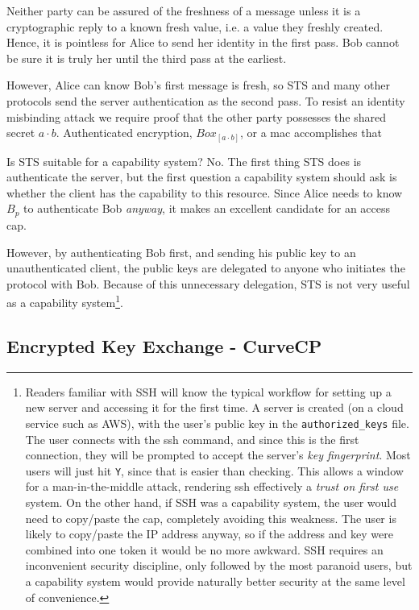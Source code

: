 \documentclass[12pt]{article}
\begin{document}
Neither party can be assured of the freshness of a message
unless it is a cryptographic reply to a known fresh value,
i.e. a value they freshly created. Hence, it is pointless for Alice
to send her identity in the first pass. Bob cannot be sure it is truly her
until the third pass at the earliest.

However, Alice can know Bob's first message is fresh, so STS and many
other protocols send the server authentication as the second pass.
To resist an identity misbinding attack we require proof that the
other party possesses the shared secret $a\cdot b$. Authenticated encryption,
$Box_{[a\cdot b]}$, or a mac accomplishes that \cite[section 3.1]{sigma}


Is STS suitable for a capability system? No. The first thing STS
does is authenticate the server, but the first question a capability
system should ask is whether the client has the capability to
this resource. Since Alice needs to know $B_p$ to authenticate
Bob \emph{anyway}, it makes an excellent candidate for an access cap.

However, by authenticating Bob first, and sending his public key to
an unauthenticated client, the public keys are delegated to anyone
who initiates the protocol with Bob. Because of this unnecessary
delegation, STS is not very useful as a capability system\footnote{
  Readers familiar with SSH will know the typical workflow for setting
  up a new server and accessing it for the first time. A server is
  created (on a cloud service such as AWS), with the user's public
  key in the \texttt{authorized\_keys} file. The user connects with the
  ssh command, and since this is the first connection, they will be
  prompted to accept the server's \emph{key fingerprint}.
  Most users will just hit \texttt{Y}, since that is easier than
  checking. This allows a window for a man-in-the-middle attack,
  rendering ssh effectively a \emph{trust on first use} system.
  On the other hand, if SSH was a capability system, the user would
  need to copy/paste the cap, completely avoiding this weakness.
  The user is likely to copy/paste the IP address anyway, so if the
  address and key were combined into one token it would be no more
  awkward.
  SSH requires an inconvenient security discipline, only
  followed by the most paranoid users, but a capability system
  would provide naturally better security at the same level of
  convenience.
}.

\subsection{Encrypted Key Exchange - CurveCP}
\end{document}
